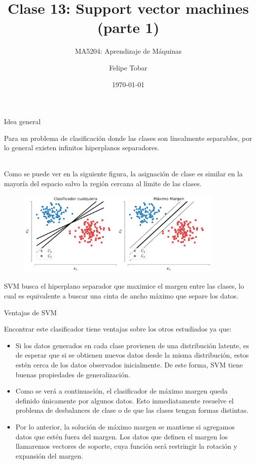 \documentclass[handout, 9pt]{beamer}
\title{Clase 13: Support vector machines (parte 1)}
\subtitle{MA5204: Aprendizaje de Máquinas}
\date{\today}
\author{Felipe Tobar}
\institute{Department of Mathematical Engineering \&\\ Center for Mathematical Modelling\\Universidad de Chile}
\begin{document}
\begin{frame}
  \titlepage
\end{frame}

\begin{frame}{Idea general}

Para un problema de clasificación donde las clases son linealmente separables, por lo general existen infinitos hiperplanos separadores.\\~\ \pause

Como se puede ver en la siguiente figura, la asignación de clase es similar en la mayoría del espacio salvo la región cercana al límite de las clases.

\begin{figure}[ht]
    \centering
    \includegraphics[width=0.9\textwidth]{../img/cap5_max_margen.pdf}
\end{figure}\pause

SVM busca el hiperplano separador que maximice el margen entre las clases, lo cual es equivalente a buscar una cinta de ancho máximo que separe los datos.
	
\end{frame}


\begin{frame}{Ventajas de SVM}

Encontrar este clasificador tiene ventajas sobre los otros estudiados ya que:

\begin{itemize}
	\item Si los datos generados en cada clase provienen de una distribución latente, es de esperar que si se obtienen nuevos datos desde la misma distribución, estos estén cerca de los datos observados inicialmente. De este forma, SVM tiene buenas propiedades de generalización.\pause
	\item Como se verá a continuación, el clasificador de máximo margen queda definido únicamente por algunos datos. Esto inmediatamente resuelve el problema de desbalances de clase o de que las clases tengan formas distintas.\pause
	\item Por lo anterior, la solución de máximo margen se mantiene si agregamos datos que estén fuera del margen. Los datos que definen el margen los llamaremos vectores de soporte, cuya función será restringir la rotación y expansión del margen.
\end{itemize}
	
\end{frame}
\end{document}
